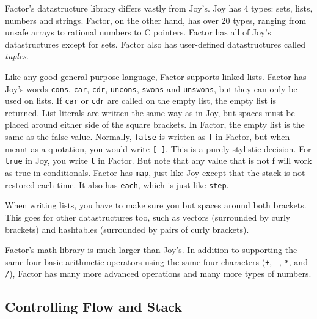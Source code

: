 \documentclass{article}
\begin{document}
Factor's datastructure library differs vastly from Joy's. Joy has 4 types: sets, lists, numbers and strings. Factor, on the other hand, has over 20 types, ranging from unsafe arrays to rational numbers to C pointers. Factor has all of Joy's datastructures except for sets. Factor also has user-defined datastructures called \emph{tuples}.

Like any good general-purpose language, Factor supports linked lists. Factor has Joy's words \texttt{cons}, \texttt{car}, \texttt{cdr}, \texttt{uncons}, \texttt{swons} and \texttt{unswons}, but they can only be used on lists. If \texttt{car} or \texttt{cdr} are called on the empty list, the empty list is returned. List literals are written the same way as in Joy, but spaces must be placed around either side of the square brackets. In Factor, the empty list is the same as the false value. Normally, \texttt{false} is written as \texttt{f} in Factor, but when meant as a quotation, you would write \texttt{[ ]}. This is a purely stylistic decision. For \texttt{true} in Joy, you write \texttt{t} in Factor. But note that any value that is not f will work as true in conditionals. Factor has \texttt{map}, just like Joy except that the stack is not restored each time. It also has \texttt{each}, which is just like \texttt{step}.

When writing lists, you have to make sure you but spaces around both brackets. This goes for other datastructures too, such as vectors (surrounded by curly brackets) and hashtables (surrounded by pairs of curly brackets).

Factor's math library is much larger than Joy's. In addition to supporting the same four basic arithmetic operators using the same four characters (\texttt{+}, \texttt{-}, \texttt{*}, and \texttt{/}), Factor has many more advanced operations and many more types of numbers.

\subsection{Controlling Flow and Stack}
\end{document}
